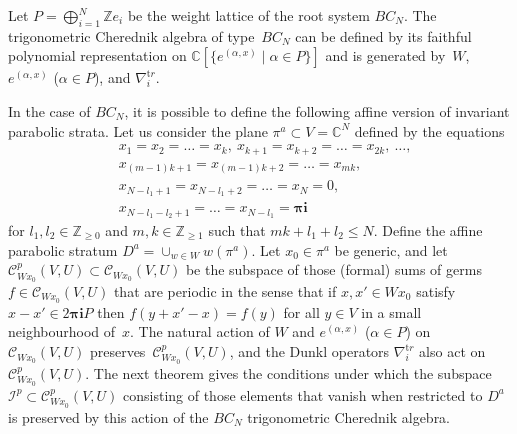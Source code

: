 \documentclass[12pt]{amsart}
\newcommand{\C}{\mathbb C}
\newcommand{\Z}{\mathbb Z}
\numberwithin{equation}{section}
\theoremstyle{definition}
\begin{document}
Let $P = \bigoplus_{i=1}^N \Z e_i$ be the weight lattice of the root system $BC_N$.
The trigonometric Cherednik algebra of type~$BC_N$ can be defined by its faithful polynomial representation on $\C[\{e^{(\alpha , x)} \mid \alpha \in P \}]$ and is generated by~$W$,~$e^{(\alpha , x)}$ ($\alpha \in P$), and $\nabla_i^{\mathrm tr}$.

In the case of $BC_N$, it is possible to define the following affine version of invariant parabolic strata. Let us consider the plane $\pi^a \subset V = \C^N$ defined by the equations
\begin{equation}    
\begin{aligned}
\label{BCstrata}
    &x_1 = x_2 = \dots = x_k, \ x_{k+1} = x_{k + 2} = \dots = x_{2k}, \ \dots, \\
    &x_{(m-1)k+1} = x_{(m-1)k+2} = \dots = x_{mk}, \\
    &x_{N - l_1 + 1} = x_{N - l_1 + 2} = \dots = x_{N} = 0, \\
    &x_{N-l_1-l_2 +1} = \dots = x_{N-l_1} = \boldsymbol{\pi} \boldsymbol{i}
\end{aligned}
\end{equation}
for $l_1, l_2 \in \Z_{\geq 0}$ and $m, k \in \Z_{\geq 1}$ such that $mk + l_1 + l_2 \leq N$.
Define the affine parabolic stratum $D^a = \cup_{w \in W} w(\pi^a)$. 
Let $x_0 \in \pi^a$ be generic, and let $\mathcal{C}^p_{Wx_0}(V, U) \subset \mathcal{C}_{Wx_0}(V, U)$ be the subspace of those (formal) sums of germs $f \in \mathcal{C}_{Wx_0}(V, U)$ that are periodic in the sense that if $x, x' \in Wx_0$ satisfy $x - x' \in 2\boldsymbol{\pi} \boldsymbol{i} P$ then 
$f(y + x'-x) = f(y)$ for all $y \in V$ in a small neighbourhood of~$x$.
The natural action of $W$ and $e^{(\alpha,x)}$ ($\alpha \in P$) on $\mathcal{C}_{Wx_0}(V, U)$ preserves~$\mathcal{C}^p_{Wx_0}(V, U)$, and
the Dunkl operators $\nabla_i^{\mathrm tr}$ also act on $\mathcal{C}^p_{Wx_0}(V, U)$.
The next theorem gives the conditions under which
the subspace $\mathcal{I}^p \subset \mathcal{C}^p_{Wx_0}(V, U)$ consisting of those elements that vanish when restricted to $D^a$ is preserved by this action of the $BC_N$ trigonometric Cherednik algebra.
\end{document}
